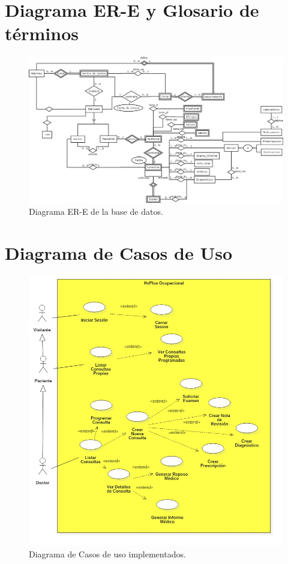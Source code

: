 \appendix

\chapter{Diagrama ER-E y Glosario de términos} \label{ere}

    

    \begin{figure}[h!]
        \begin{center}
            \includegraphics[scale=.4,angle=90]{figures/DiagramBD}
        \end{center}
        \caption{Diagrama ER-E de la base de datos.}
        \label{ere-diagrama}
    \end{figure}
    
\chapter{Diagrama de Casos de Uso} \label{dcu}

    \begin{figure}[htbp!]
        \begin{center}
            \includegraphics[scale=.4]{figures/UseCaseDiagram1}
        \end{center}
        \caption{Diagrama de Casos de uso implementados.}
    \end{figure}

\pagebreak